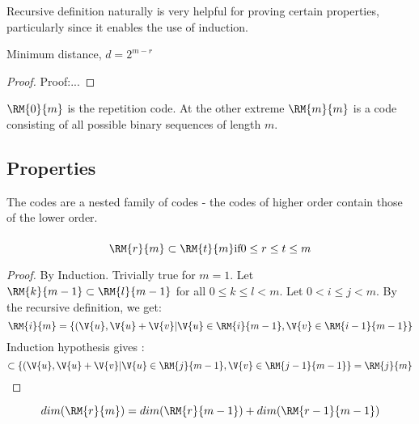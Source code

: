 Recursive definition naturally is very helpful for proving certain properties, particularly since it enables the use of induction.

\begin{thm}
Minimum distance, $d=2^{m-r}$
\begin{proof}
Proof:...
\end{proof}
\end{thm}

$\RM{0}{m} $ is the repetition code. At the other extreme $\RM{m}{m}$ is a code consisting of all possible binary sequences of length $m$.
\subsection{Properties}

The \rem codes are a nested family of codes - the codes of higher order contain those of the lower order.
\begin{thm}
  \begin{equation*}
    
  \end{equation*}
\begin{equation*}
\RM{r}{m} \subset \RM{t}{m} 
\text{if} 0 \leq r \leq t \leq m \\
\end{equation*}

\begin{proof}
By Induction.
Trivially true for $m=1$.
Let $\RM{k}{m-1} \subset \RM{l}{m-1}$ for all $0 \leq k \leq l < m$.
Let $0 <i \leq j < m$. By the recursive definition, we get:
\begin{equation*}
  \RM{i}{m}=\{(\V{u},\V{u}+\V{v} | \V{u} \in \RM{i}{m-1}, \V{v} \in \RM{i-1}{m-1} \}
\end{equation*}
Induction hypothesis gives :
\begin{equation*}
  \subset \{(\V{u},\V{u}+\V{v} | \V{u} \in \RM{j}{m-1}, \V{v} \in \RM{j-1}{m-1} \} = \RM{j}{m}
\end{equation*}

\end{proof}
\end{thm}

\begin{equation}
  \label{eq:1}
  dim(\RM{r}{m}) = dim(\RM{r}{m-1}) + dim(\RM{r-1}{m-1})
\end{equation}

\begin{thm}
  \begin{equation}
    \label{eq:2}
    
  \end{equation}
\end{thm}


